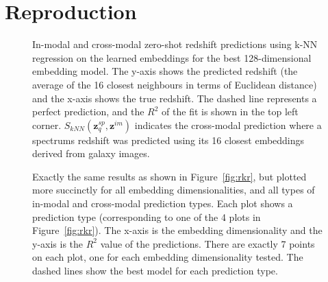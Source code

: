 \documentclass[a4paper,11pt]{article}
\begin{document}
\section{Reproduction}\label{sec:reproduction}
\begin{figure}[t]
    \centering
    \caption{In-modal and cross-modal zero-shot redshift predictions using k-NN regression on the learned embeddings for the
    best 128-dimensional embedding model.
    The y-axis shows the predicted redshift (the average of the 16 closest neighbours in terms of Euclidean distance) and the x-axis shows the true redshift.
    The dashed line represents a perfect prediction, and the $R^{2}$ of the fit is shown in the top left corner.
    $S_{kNN}(\mathbf{z}_{q}^{sp}, \mathbf{z}^{im})$ indicates the cross-modal prediction where a spectrums redshift was
    predicted using its 16 closest embeddings derived from galaxy images.}
    \label{fig:rkr}
\end{figure}

\begin{figure}[t]
    \centering
    \caption{Exactly the same results as shown in Figure~\eqref{fig:rkr}, but plotted more succinctly for all embedding
    dimensionalities, and all types of in-modal and cross-modal prediction types.
    Each plot shows a prediction type (corresponding to one of the 4 plots in Figure~\eqref{fig:rkr}).
    The x-axis is the embedding dimensionality and the y-axis is the $R^{2}$ value of the predictions.
    There are exactly 7 points on each plot, one for each embedding dimensionality tested.
    The dashed lines show the best model for each prediction type.}
    \label{fig:r2_vs_embedding_dim}
\end{figure}
\end{document}
